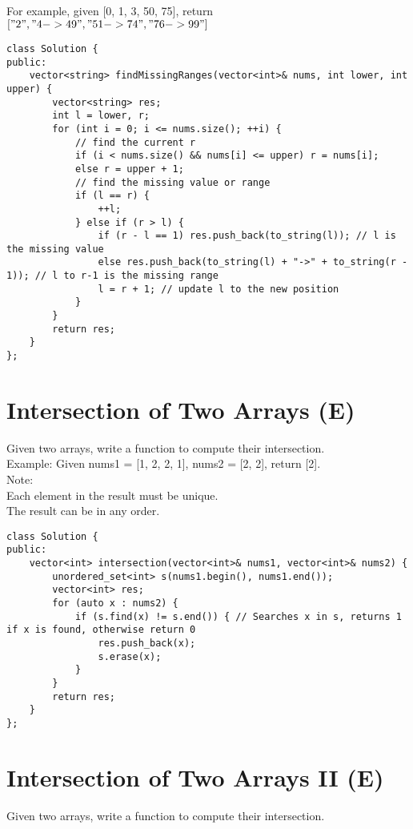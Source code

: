 For example, given [0, 1, 3, 50, 75], return $["2", "4->49", "51->74", "76->99"]$ \\

\begin{lstlisting}
class Solution {
public:
    vector<string> findMissingRanges(vector<int>& nums, int lower, int upper) {
        vector<string> res;
        int l = lower, r;
        for (int i = 0; i <= nums.size(); ++i) {
            // find the current r
            if (i < nums.size() && nums[i] <= upper) r = nums[i];
            else r = upper + 1;
            // find the missing value or range
            if (l == r) {
                ++l;
            } else if (r > l) {
                if (r - l == 1) res.push_back(to_string(l)); // l is the missing value
                else res.push_back(to_string(l) + "->" + to_string(r - 1)); // l to r-1 is the missing range
                l = r + 1; // update l to the new position
            }
        }
        return res;
    }
};
\end{lstlisting}


\section{Intersection of Two Arrays (E)}
Given two arrays, write a function to compute their intersection.\\

Example:
Given nums1 = [1, 2, 2, 1], nums2 = [2, 2], return [2].\\

Note: \\
    Each element in the result must be unique.\\
    The result can be in any order.\\
    
\begin{lstlisting}
class Solution {
public:
    vector<int> intersection(vector<int>& nums1, vector<int>& nums2) {
        unordered_set<int> s(nums1.begin(), nums1.end());
        vector<int> res;
        for (auto x : nums2) {
            if (s.find(x) != s.end()) { // Searches x in s, returns 1 if x is found, otherwise return 0
                res.push_back(x);
                s.erase(x);
            }
        }
        return res;
    }
};
\end{lstlisting}   


\section{Intersection of Two Arrays II (E)}
Given two arrays, write a function to compute their intersection.\\

